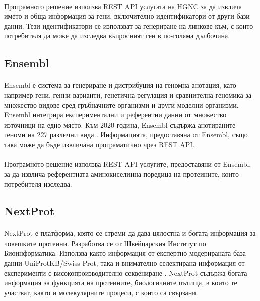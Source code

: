 \documentclass[pdftex,cyrillic,14pt,a4page,twoside,openright]{extreport}
\begin{document}
\paragraph{}
Програмното решение използва REST API услугата на HGNC за да извлича името и обща информация за гени, включително идентификатори от други бази данни. Тези идентификатори се използват за генериране на линкове към, с които потребителя да може да изследва въпросният ген в по-голяма дълбочина.

\subsection{Ensembl}\label{sec:ensembl}
\paragraph{}
Ensembl е система за генериране и дистрибуция на геномна анотация, като например гени, генни варианти, генетична регулация и сравнителна геномика за множество видове сред гръбначните организми и други моделни организми. Ensembl интегрира експериментални и референтни данни от множество източници на едно място. Към 2020 година, Ensembl съдържа анотираните геноми на 227 различни вида \cite{yates2020}. Информацията, предоставяна от Ensembl, също така може да бъде извличана програматично чрез REST API.

\paragraph{}
Програмното решение използва REST API услугите, предоставяни от Ensembl, за да извлича референтната аминокиселинна поредица на протеините, които потребителя изследва.

\subsection{NextProt}\label{sec:nextprot}
\paragraph{}
NextProt е платформа, която се стреми да дава цялостна и богата информация за човешките протеини. Разработва се от Швейцарския Институт по Биоинформатика. Използва както информация от експертно-модерираната база данни UniProtKB/Swiss-Prot, така и внимателно селектирана информация от експерименти с високопроизводително секвениране \cite{lane2011}. NextProt съдържа богата информация за функцията на протеините, биологичните пътища, в които те участват, както и молекулярните процеси, с които са свързани.
\end{document}
